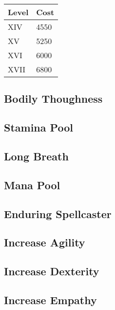 \begin{minipage}{0.25\textwidth}
    \begin{tabular}{l | l}
        Level & Cost\\ \hline
        XIV & 4550\\
        XV & 5250\\
        XVI & 6000\\
        XVII & 6800\\
    \end{tabular}
\end{minipage}

\subsection{Bodily Thoughness}\label{subsec:bodilyThoughness}

\subsection{Stamina Pool}\label{subsec:staminaPool}

\subsection{Long Breath}\label{subsec:longBreath}

\subsection{Mana Pool}\label{subsec:manaPool}

\subsection{Enduring Spellcaster}\label{subsec:enduringSpellcaster}

\subsection{Increase Agility}\label{subsec:increaseAgility}

\subsection{Increase Dexterity}\label{subsec:increaseDexterity}

\subsection{Increase Empathy}\label{subsec:increaseEmpathy}

